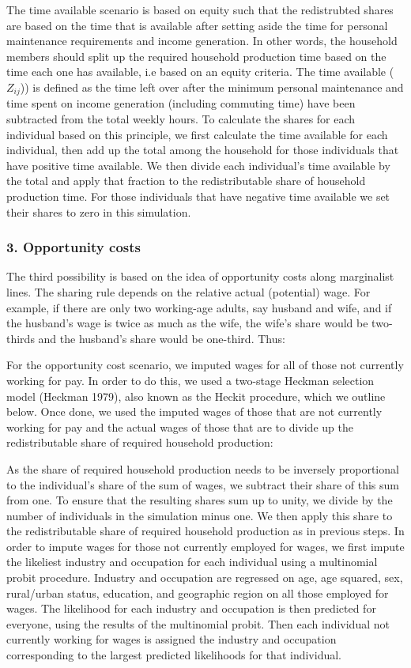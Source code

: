 \documentclass[
  11pt,
]{article}
\begin{document}
The time available scenario is based on equity such that the
redistrubted shares are based on the time that is available after
setting aside the time for personal maintenance requirements and income
generation. In other words, the household members should split up the
required household production time based on the time each one has
available, i.e based on an equity criteria. The time available
(\(Z_{ij}\))) is defined as the time left over after the minimum
personal maintenance and time spent on income generation (including
commuting time) have been subtracted from the total weekly hours. To
calculate the shares for each individual based on this principle, we
first calculate the time available for each individual, then add up the
total among the household for those individuals that have positive time
available. We then divide each individual's time available by the total
and apply that fraction to the redistributable share of household
production time. For those individuals that have negative time available
we set their shares to zero in this simulation.

\subsubsection{3. Opportunity costs}\label{opportunity-costs}

The third possibility is based on the idea of opportunity costs along
marginalist lines. The sharing rule depends on the relative actual
(potential) wage. For example, if there are only two working-age adults,
say husband and wife, and if the husband's wage is twice as much as the
wife, the wife's share would be two-thirds and the husband's share would
be one-third. Thus:

For the opportunity cost scenario, we imputed wages for all of those not
currently working for pay. In order to do this, we used a two-stage
Heckman selection model (Heckman 1979), also known as the Heckit
procedure, which we outline below. Once done, we used the imputed wages
of those that are not currently working for pay and the actual wages of
those that are to divide up the redistributable share of required
household production:

As the share of required household production needs to be inversely
proportional to the individual's share of the sum of wages, we subtract
their share of this sum from one. To ensure that the resulting shares
sum up to unity, we divide by the number of individuals in the
simulation minus one. We then apply this share to the redistributable
share of required household production as in previous steps. In order to
impute wages for those not currently employed for wages, we first impute
the likeliest industry and occupation for each individual using a
multinomial probit procedure. Industry and occupation are regressed on
age, age squared, sex, rural/urban status, education, and geographic
region on all those employed for wages. The likelihood for each industry
and occupation is then predicted for everyone, using the results of the
multinomial probit. Then each individual not currently working for wages
is assigned the industry and occupation corresponding to the largest
predicted likelihoods for that individual.
\end{document}
